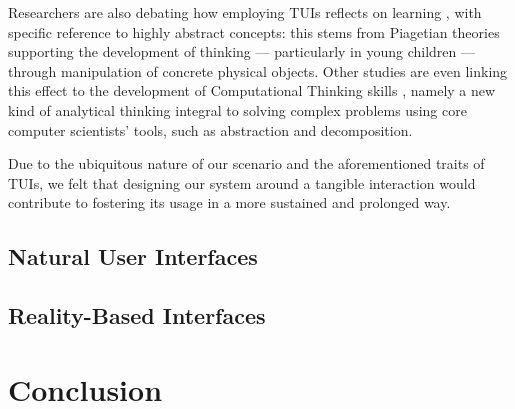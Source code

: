 Researchers are also debating how employing \acp{TUI} reflects on learning \cite{Horn:2009be,Marshall:2007dr,Antle:2013ho}, with specific reference to highly abstract concepts: this stems from Piagetian theories supporting the development of thinking --- particularly in young children --- through manipulation of concrete physical objects. Other studies \cite{Wang:2014jy,Horn:2011ch} are even linking this effect to the development of Computational Thinking skills \cite{Wing:2006iz}, namely a new kind of analytical thinking integral to solving complex problems using core computer scientists' tools, such as abstraction and decomposition.

Due to the ubiquitous nature of our scenario and the aforementioned traits of \acp{TUI}, we felt that designing our system around a tangible interaction would contribute to fostering its usage in a more sustained and prolonged way.

\subsection{Natural User Interfaces}

\subsection{Reality-Based Interfaces}

\section{Conclusion}